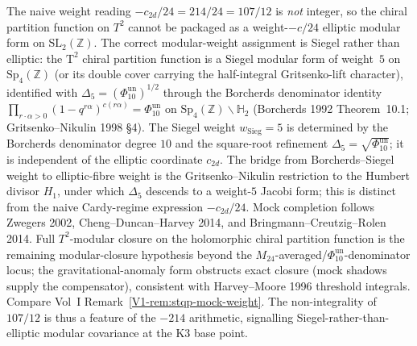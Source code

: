 \begin{remark}
\label{rem:anomtop-T2-modular}
The naive weight reading $-c_{2d}/24 = 214/24 = 107/12$ is
\emph{not} integer, so the chiral partition function on $T^2$
cannot be packaged as a weight-$-c/24$ elliptic modular form on
$\mathrm{SL}_2(\mathbb Z)$. The correct modular-weight assignment
is Siegel rather than elliptic: the
$\mathrm T^2$ chiral partition function is a Siegel modular form
of weight~$5$ on $\mathrm{Sp}_4(\mathbb Z)$ (or its double cover
carrying the half-integral Gritsenko-lift character), identified
with $\Delta_5 = (\Phi_{10}^{\mathrm{un}})^{1/2}$ through the Borcherds denominator
identity
$\prod_{r\cdot\alpha>0}(1-q^{r\alpha})^{c(r\alpha)} = \Phi_{10}^{\mathrm{un}}$
on $\mathrm{Sp}_4(\mathbb Z)\backslash\mathbb H_2$ (Borcherds 1992
Theorem~10.1; Gritsenko--Nikulin 1998 \S 4). The Siegel weight
$w_{\mathrm{Sieg}} = 5$ is determined by the Borcherds denominator
degree $10$ and the square-root refinement
$\Delta_5 = \sqrt{\Phi_{10}^{\mathrm{un}}}$; it is independent of the elliptic
coordinate $c_{2d}$. The bridge from Borcherds--Siegel weight to
elliptic-fibre weight is the Gritsenko--Nikulin restriction to the
Humbert divisor $H_1$, under which $\Delta_5$ descends to a
weight-$5$ Jacobi form; this is distinct from the naive
Cardy-regime expression $-c_{2d}/24$. Mock completion follows
Zwegers 2002, Cheng--Duncan--Harvey 2014, and
Bringmann--Creutzig--Rolen 2014. Full $T^2$-modular closure on
the holomorphic chiral partition function is the remaining
modular-closure hypothesis beyond the
$M_{24}$-averaged/$\Phi_{10}^{\mathrm{un}}$-denominator locus; the
gravitational-anomaly form obstructs exact closure (mock shadows
supply the compensator), consistent with Harvey--Moore 1996
threshold integrals. Compare Vol~I
Remark~\ref{V1-rem:stqp-mock-weight}. The non-integrality of
$107/12$ is thus a feature of the $-214$ arithmetic, signalling
Siegel-rather-than-elliptic modular covariance at the K3 base
point.
\end{remark}


